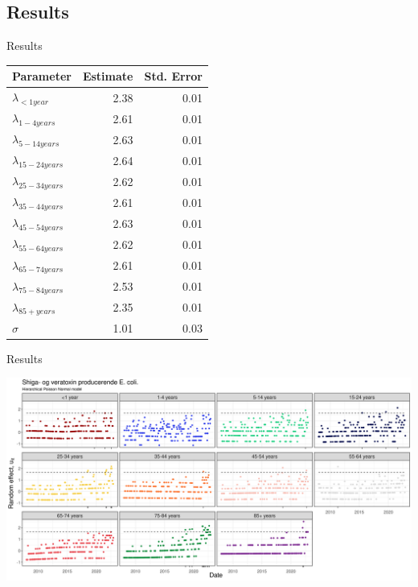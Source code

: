 \documentclass[aspectratio=169]{beamer}
\begin{document}
\hypertarget{results}{%
\subsection{Results}\label{results}}

\begin{frame}{Results}
\tiny

\begin{table}
\centering\begingroup\fontsize{10}{12}\selectfont

\begin{tabular}{lrr}
\toprule
Parameter & Estimate & Std. Error\\
\midrule
$\lambda_{<1 year}$ & 2.38 & 0.01\\
$\lambda_{1-4 years}$ & 2.61 & 0.01\\
$\lambda_{5-14 years}$ & 2.63 & 0.01\\
$\lambda_{15-24 years}$ & 2.64 & 0.01\\
$\lambda_{25-34 years}$ & 2.62 & 0.01\\
$\lambda_{35-44 years}$ & 2.61 & 0.01\\
$\lambda_{45-54 years}$ & 2.63 & 0.01\\
$\lambda_{55-64 years}$ & 2.62 & 0.01\\
$\lambda_{65-74 years}$ & 2.61 & 0.01\\
$\lambda_{75-84 years}$ & 2.53 & 0.01\\
$\lambda_{85+ years}$ & 2.35 & 0.01\\
$\sigma$ & 1.01 & 0.03\\
\bottomrule
\end{tabular}
\endgroup{}
\end{table}

\normalsize
\end{frame}

\begin{frame}{Results}
\protect\hypertarget{results-1}{}
\tiny

\includegraphics[width=1\linewidth]{../figures/PoisLNxSTEC}

\normalsize
\end{frame}
\end{document}
